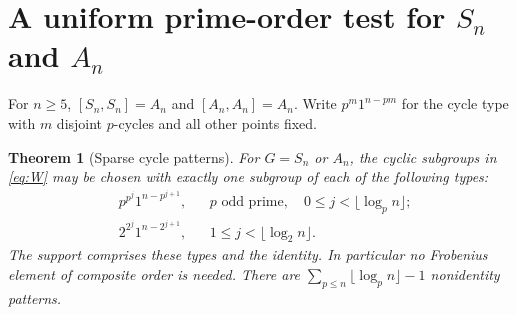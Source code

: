 \documentclass[11pt]{article}
\newtheorem{theorem}{Theorem}[section]
\theoremstyle{remark}\newtheorem{remark}[theorem]{Remark}
\begin{document}
\section{A uniform prime-order test for \texorpdfstring{$S_n$ and $A_n$}{symmetric and alternating groups}}
For $n\ge5$, $[S_n,S_n]=A_n$ and $[A_n,A_n]=A_n$.
Write $p^m1^{n-pm}$ for the cycle type with $m$ disjoint $p$-cycles
and all other points fixed.

\begin{theorem}[Sparse cycle patterns]\label{thm:sym}
For $G=S_n$ or $A_n$, the cyclic subgroups in \eqref{eq:W} may be
chosen with exactly one subgroup of each of the following types:
\begin{align*}
 &p^{p^j}1^{n-p^{j+1}}, &&p\text{ odd prime},\quad
 0\le j<\lfloor\log_p n\rfloor;\\
 &2^{2^j}1^{n-2^{j+1}}, &&1\le j<\lfloor\log_2 n\rfloor.
\end{align*}
The support comprises these types and the identity. In particular no
Frobenius element of composite order is needed. There are
$\sum_{p\le n}\lfloor\log_p n\rfloor-1$ nonidentity patterns.
\end{theorem}
\end{document}
